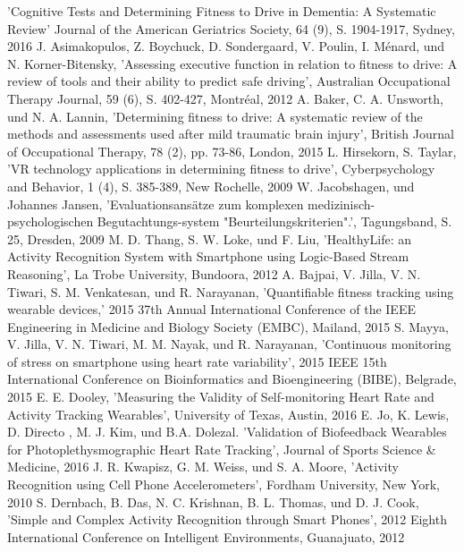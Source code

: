 \documentclass[conference]{IEEEtran}
\begin{document}
\begin{thebibliography}{00}
'Cognitive Tests and Determining Fitness to Drive in Dementia: A Systematic Review'
Journal of the American Geriatrics Society, 64 (9), S. 1904-1917, Sydney, 2016
J. Asimakopulos, Z. Boychuck, D. Sondergaard, V. Poulin, I. Ménard, und N. Korner-Bitensky, 'Assessing executive function in relation to fitness to drive: A review of tools and their ability to predict safe driving', Australian Occupational Therapy Journal, 59 (6), S. 402-427, Montréal, 2012
A. Baker, C. A. Unsworth, und N. A. Lannin,
'Determining fitness to drive: A systematic review of the methods and assessments used after mild traumatic brain injury', British Journal of Occupational Therapy, 78 (2), pp. 73-86, London, 2015
L. Hirsekorn, S. Taylar, 'VR technology applications in determining fitness to drive', Cyberpsychology and Behavior, 1 (4), S. 385-389, New Rochelle, 2009
 W. Jacobshagen, und Johannes Jansen, 'Evaluationsansätze zum komplexen medizinisch-psychologischen Begutachtungs-system "Beurteilungskriterien".', Tagungsband, S. 25, Dresden, 2009
 M. D. Thang, S. W. Loke, und F. Liu, 'HealthyLife: an Activity Recognition System with Smartphone using Logic-Based Stream Reasoning',  La Trobe University, Bundoora, 2012
  A. Bajpai, V. Jilla, V. N. Tiwari, S. M. Venkatesan, und R. Narayanan, 'Quantifiable fitness tracking using wearable devices,' 2015 37th Annual International Conference of the IEEE Engineering in Medicine and Biology Society (EMBC), Mailand, 2015
 S. Mayya, V. Jilla, V. N. Tiwari, M. M. Nayak, und R. Narayanan, 'Continuous monitoring of stress on smartphone using heart rate variability', 2015 IEEE 15th International Conference on Bioinformatics and Bioengineering (BIBE), Belgrade, 2015
 E. E. Dooley, 'Measuring the Validity of Self-monitoring Heart Rate and Activity Tracking Wearables', University of Texas, Austin, 2016
 E. Jo, K. Lewis, D. Directo , M. J.  Kim, und B.A. Dolezal. 'Validation of Biofeedback Wearables for Photoplethysmographic Heart Rate Tracking', Journal of Sports Science \& Medicine, 2016
 J. R. Kwapisz, G. M. Weiss, und S. A. Moore, 'Activity Recognition using Cell Phone Accelerometers', Fordham University, New York, 2010
 S. Dernbach, B. Das, N. C. Krishnan, B. L. Thomas, und D. J. Cook, 'Simple and Complex Activity Recognition through Smart Phones', 2012 Eighth International Conference on Intelligent Environments, Guanajuato, 2012

\end{thebibliography}
\end{document}

